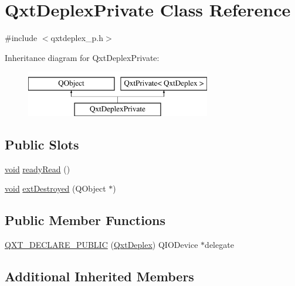 \hypertarget{class_qxt_deplex_private}{\section{Qxt\-Deplex\-Private Class Reference}
\label{class_qxt_deplex_private}
}


{\ttfamily \#include $<$qxtdeplex\-\_\-p.\-h$>$}

Inheritance diagram for Qxt\-Deplex\-Private\-:\begin{figure}[H]
\begin{center}
\leavevmode
\includegraphics[height=2.000000cm]{class_qxt_deplex_private}
\end{center}
\end{figure}
\subsection*{Public Slots}
\begin{DoxyCompactItemize}
\item 
\hyperlink{group___u_a_v_objects_plugin_ga444cf2ff3f0ecbe028adce838d373f5c}{void} \hyperlink{class_qxt_deplex_private_a04df0a16b23a067f800eab1d9a843b20}{ready\-Read} ()
\item 
\hyperlink{group___u_a_v_objects_plugin_ga444cf2ff3f0ecbe028adce838d373f5c}{void} \hyperlink{class_qxt_deplex_private_a0937635c8a6a5852700374506511f36b}{ext\-Destroyed} (Q\-Object $\ast$)
\end{DoxyCompactItemize}
\subsection*{Public Member Functions}
\begin{DoxyCompactItemize}
\item 
\hyperlink{class_qxt_deplex_private_aa9c0750cd18373c780b35a72c0c2a970}{Q\-X\-T\-\_\-\-D\-E\-C\-L\-A\-R\-E\-\_\-\-P\-U\-B\-L\-I\-C} (\hyperlink{class_qxt_deplex}{Qxt\-Deplex}) Q\-I\-O\-Device $\ast$delegate
\end{DoxyCompactItemize}
\subsection*{Additional Inherited Members}


